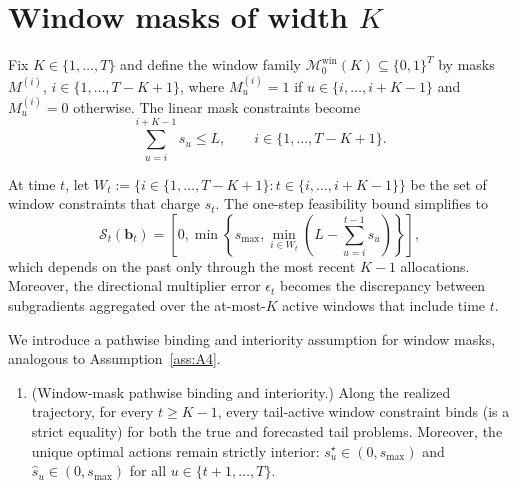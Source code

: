\documentclass[11pt]{article}
\newenvironment{assumptions}{%
  \begingroup
  \renewcommand{\labelenumi}{\textbf{A\arabic{enumi}}.}%
  \renewcommand{\theenumi}{A\arabic{enumi}}%
  \begin{enumerate}
    }{%
  \end{enumerate}
  \endgroup
}
\newcommand{\1}{\mathbf{1}}
\newcommand{\mcal}{\mathcal{M}}
\newcommand{\scalt}{\mathcal{S}_{t}}
\begin{document}




\section{Window masks of width \texorpdfstring{$K$}{K}}
\label{sec:window-masks}%

Fix $K \in \{1,\dots,T\}$ and define the window family $\mcal_{0}^{\mathrm{win}}(K) \subseteq \{0,1\}^{T}$ by masks $M^{(i)}$, $i \in \{1,\dots,T-K+1\}$, where $M^{(i)}_u = 1$ if $u \in \{i,\dots,i+K-1\}$ and $M^{(i)}_u = 0$ otherwise.
The linear mask constraints become
\begin{equation*}
  \sum_{u=i}^{i+K-1} s_u \leq L, \qquad i \in \{1,\dots,T-K+1\}.
\end{equation*}

At time $t$, let $W_t := \{i \in \{1,\dots,T-K+1\} : t \in \{i,\dots,i+K-1\}\}$ be the set of window constraints that charge $s_t$.
The one-step feasibility bound simplifies to
\begin{equation*}
  \scalt(\mathbf{b}_t) = \left[0, \min\left\{s_{\max}, \min_{i \in W_t}\left(L - \sum_{u=i}^{t-1} s_u\right)\right\}\right],
\end{equation*}
which depends on the past only through the most recent $K-1$ allocations.
Moreover, the directional multiplier error $\epsilon_t$ becomes the discrepancy between subgradients aggregated over the at-most-$K$ active windows that include time $t$.

We introduce a pathwise binding and interiority assumption for window masks, analogous to Assumption~\ref{ass:A4}.
\begin{assumptions}
\item[A6.]\label{ass:A6-win} (Window-mask pathwise binding and interiority.)
  Along the realized trajectory, for every $t \ge K-1$, every tail-active window constraint binds (is a strict equality) for both the true and forecasted tail problems.
  Moreover, the unique optimal actions remain strictly interior: $s_u^{\star} \in (0, s_{\max})$ and $\hat{s}_u \in (0, s_{\max})$ for all $u \in \{t+1,\dots,T\}$.
\end{assumptions}
\end{document}
